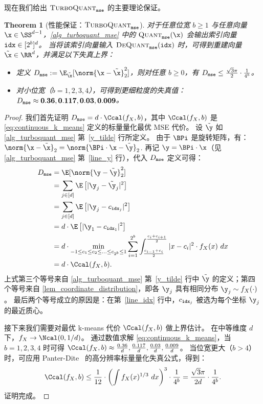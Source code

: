 \documentclass[11pt]{ctexart}
\newtheorem{theorem}{Theorem}
\newcommand{\TurboQuant}{\textsc{TurboQuant}\xspace}
\let\cref\ref
\begin{document}
现在我们给出 $\TurboQuant_{\tt mse}$ 的主要理论保证。
\begin{theorem}[性能保证：$\TurboQuant_{\tt mse}$]\label{thrm_mse}
对于任意位宽 $b \ge 1$ 与任意向量 $\x \in \SS^{d-1}$，\cref{alg_turboquant_mse} 中的 $\textsc{Quant}_{\tt mse}(\x)$ 会输出索引向量 ${\tt idx} \in [2^b]^d$。
当将该索引向量输入 $\textsc{DeQuant}_{\tt mse}({\tt idx})$ 时，可得到重建向量 $\tilde{\x} \in \RR^d$，并满足以下失真上界：
\begin{itemize}
    \item 定义 $D_{\tt mse} := \E_{\tilde{\x}}[ \norm{\x - \tilde{\x}}_2^2 ]$，则对任意 $b \ge 0$，有 $D_{\tt mse} \le \frac{\sqrt{3} \pi}{2} \cdot \frac{1}{4^{b}}$。
    \item 对小位宽（$b = 1, 2, 3, 4$），可得到更细粒度的失真值：$D_{\tt mse} \approx {\bf 0.36}, {\bf 0.117}, {\bf 0.03}, {\bf 0.009}$。
\end{itemize}
\end{theorem}
\begin{proof}
我们首先证明 $D_{\tt mse} = d \cdot \Ccal(f_X, b)$，其中 $\Ccal(f_X, b)$ 是 \cref{eq:continuous_k_means} 定义的标量量化最优 MSE 代价。
设 $\tilde{\y}$ 如 \cref{alg_turboquant_mse} 第~\ref{y_tilde} 行所定义。
由于 $\BPi$ 是旋转矩阵，有：
$\norm{\x - \tilde{\x}}_2 = \norm{\BPi \cdot \x - \tilde{\y}}_2$.
再记 $\y = \BPi \cdot \x$（见 \cref{alg_turboquant_mse} 第~\ref{line_y} 行），代入 $D_{\tt mse}$ 定义可得：
\begin{align*}
    D_{\tt mse} &= \E [\norm{\y - \tilde{\y}}_2^2] \\
    &= \sum_{j \in [d]} \E\left[ |\y_j - \tilde{\y}_j|^2 \right] \\
    &= \sum_{j \in [d]} \E\left[ |\y_j - c_{{\tt idx}_j}|^2 \right]\\
    &= d \cdot \E\left[ |\y_1 - c_{{\tt idx}_1}|^2 \right] \\
    &= d \cdot \min_{-1 \le c_1 \le c_2 \le \ldots \le c_{2^b} \le 1} \sum_{i=1}^{2^b} \int_{\frac{c_{i-1} + c_i}{2}}^{\frac{c_i + c_{i+1}}{2}} |x - c_i|^2 \cdot f_X(x)~dx \\
    &= d \cdot \Ccal(f_X, b).
\end{align*}
上式第三个等号来自 \cref{alg_turboquant_mse} 第~\ref{y_tilde} 行中 $\tilde{\y}$ 的定义；第四个等号来自 \cref{lem_coordinate_distribution}，即各 $\y_j$ 具有相同分布 $\y_j \sim f_X(\cdot)$。
最后两个等号成立的原因是：在第~\ref{line_idx} 行中，$c_{{\tt idx}_j}$ 被选为每个坐标 $\y_j$ 的最近质心。

接下来我们需要对最优 k-means 代价 $\Ccal(f_X, b)$ 做上界估计。
在中等维度 $d$ 下，$f_X \to \Ncal(0, 1/d)$。
通过数值求解 \cref{eq:continuous_k_means}，当 $b = 1,2,3,4$ 时可得
$\Ccal(f_X, b) \approx \frac{0.36}{d}, \frac{0.117}{d}, \frac{0.03}{d}, \frac{0.009}{d}$。
当位宽更大（$b > 4$）时，可应用 Panter-Dite~\cite{panter1951quantization} 的高分辨率标量量化失真公式，得到：
\[
\Ccal(f_X, b) \le \frac{1}{12} \cdot \left( \int f_X(x)^{1/3}~dx \right)^3 \cdot \frac{1}{4^b} =  \frac{\sqrt{3} \pi }{2 d} \cdot \frac{1}{4^b}.
\]
证明完成。
\end{proof}
\end{document}
